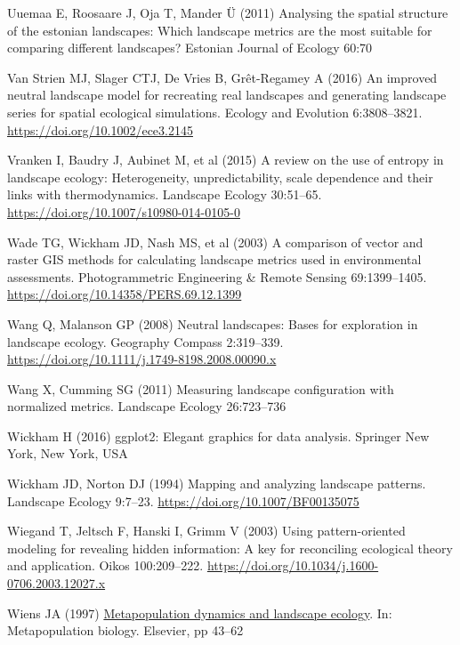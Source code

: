 \documentclass[
  10pt,
  a4paperpaper,
]{article}
\newlength{\cslhangindent}
\newenvironment{CSLReferences}[2] %
 {\begin{list}{}{%
  \setlength{\itemindent}{0pt}
  \setlength{\leftmargin}{0pt}
  \setlength{\parsep}{0pt}
  \ifodd #1
   \setlength{\leftmargin}{\cslhangindent}
   \setlength{\itemindent}{-1\cslhangindent}
  \fi
  \setlength{\itemsep}{#2\baselineskip}}}
 {\end{list}}
\begin{document}
\begin{CSLReferences}{1}{1}
Uuemaa E, Roosaare J, Oja T, Mander Ü (2011) Analysing the spatial
structure of the estonian landscapes: Which landscape metrics are the
most suitable for comparing different landscapes? Estonian Journal of
Ecology 60:70

Van Strien MJ, Slager CTJ, De Vries B, Grêt-Regamey A (2016) An improved
neutral landscape model for recreating real landscapes and generating
landscape series for spatial ecological simulations. Ecology and
Evolution 6:3808--3821. \url{https://doi.org/10.1002/ece3.2145}

Vranken I, Baudry J, Aubinet M, et al (2015) A review on the use of
entropy in landscape ecology: Heterogeneity, unpredictability, scale
dependence and their links with thermodynamics. Landscape Ecology
30:51--65. \url{https://doi.org/10.1007/s10980-014-0105-0}

Wade TG, Wickham JD, Nash MS, et al (2003) A comparison of vector and
raster GIS methods for calculating landscape metrics used in
environmental assessments. Photogrammetric Engineering \& Remote Sensing
69:1399--1405. \url{https://doi.org/10.14358/PERS.69.12.1399}

Wang Q, Malanson GP (2008) Neutral landscapes: Bases for exploration in
landscape ecology. Geography Compass 2:319--339.
\url{https://doi.org/10.1111/j.1749-8198.2008.00090.x}

Wang X, Cumming SG (2011) Measuring landscape configuration with
normalized metrics. Landscape Ecology 26:723--736

Wickham H (2016) ggplot2: Elegant graphics for data analysis. Springer
New York, New York, USA

Wickham JD, Norton DJ (1994) Mapping and analyzing landscape patterns.
Landscape Ecology 9:7--23. \url{https://doi.org/10.1007/BF00135075}

Wiegand T, Jeltsch F, Hanski I, Grimm V (2003) Using pattern-oriented
modeling for revealing hidden information: A key for reconciling
ecological theory and application. Oikos 100:209--222.
\url{https://doi.org/10.1034/j.1600-0706.2003.12027.x}

Wiens JA (1997)
\href{https://doi.org/10.1016/B978-012323445-2/50005-5}{Metapopulation
dynamics and landscape ecology}. In: Metapopulation biology. Elsevier,
pp 43--62


\end{CSLReferences}
\end{document}
